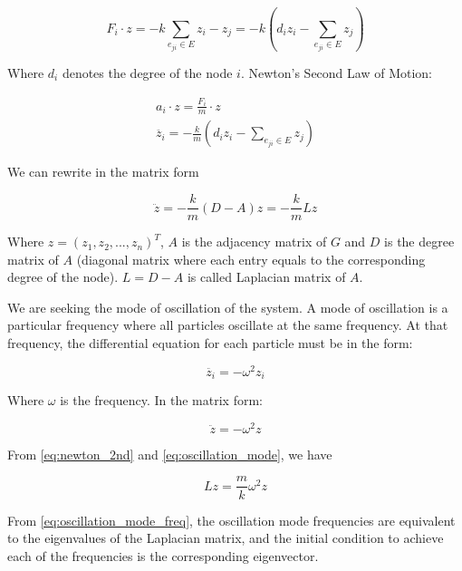\documentclass{article}
\begin{document}
    \begin{equation}
        F_i \cdot z = - k \sum_{e_{j i} \in E} z_i - z_j = - k (d_i z_i - \sum_{e_{j i} \in E} z_j)
    \end{equation}

    Where $d_i$ denotes the degree of the node $i$. Newton's Second Law of Motion:

    \begin{gather*}
        a_i \cdot z = \frac{F_i}{m} \cdot z \\
        \ddot{z_i} = - \frac{k}{m} (d_i z_i - \sum_{e_{j i} \in E} z_j)
    \end{gather*}

    We can rewrite in the matrix form

    \begin{equation}
        \ddot{z} =  - \frac{k}{m} (D - A) z = - \frac{k}{m} L z
        \label{eq:newton_2nd}
    \end{equation}

    Where $z = (z_1, z_2, ..., z_n)^T$, $A$ is the adjacency matrix of $G$ and $D$ is the degree matrix of $A$ (diagonal matrix where each entry equals to the corresponding degree of the node). $L = D - A$ is called Laplacian matrix of $A$.

    We are seeking the mode of oscillation of the system. A mode of oscillation is a particular frequency where all particles oscillate at the same frequency. At that frequency, the differential equation for each particle must be in the form:

    \begin{equation}
        \ddot{z_i} = - \omega^2 z_i
    \end{equation}

    Where $\omega$ is the frequency. In the matrix form:

    \begin{equation}
        \ddot{z} = - \omega^2 z
        \label{eq:oscillation_mode}
    \end{equation}

    From \ref{eq:newton_2nd} and \ref{eq:oscillation_mode}, we have

    \begin{equation}
        L z = \frac{m}{k} \omega^2 z
        \label{eq:oscillation_mode_freq}
    \end{equation}

    From \ref{eq:oscillation_mode_freq}, the oscillation mode frequencies are equivalent to the eigenvalues of the Laplacian matrix, and the initial condition to achieve each of the frequencies is the corresponding eigenvector.
\end{document}
